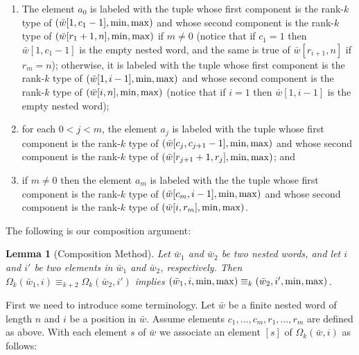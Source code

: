 \documentclass{LMCS}
\newcommand{\w}{{\bar{w}}}
\theoremstyle{plain}
\newtheorem{lemma}[theorem]{Lemma}
\theoremstyle{definition}
\begin{document}
\begin{enumerate}[$\bullet$] 

\item The element $a_0$ is labeled
with the tuple whose first component is
 the rank-$k$ type of
 $(\w[1,c_1-1],\min,\maxx)$ and whose second component is the rank-$k$  
type of 
$(\w[r_1+1,n],\min,\maxx)$ if $m \neq 0$ (notice that if $c_1 = 1$ then 
$\w[1,c_1-1]$ is the empty nested word, and the same is true of
$\w[r_{i+1},n]$ if $r_m = n$); otherwise, it 
is labeled with the tuple whose first component is
 the rank-$k$  type of
 $(\w[1,i-1],\min,\maxx)$ and whose second component is the rank-$k$  
type of 
$(\w[i,n],\min,\maxx)$ (notice that if $i = 1$ then 
$\w[1,i-1]$ is the empty nested word);

\item 
for each $0 < j < m$, the element $a_j$ is labeled with the tuple whose
 first component is 
 the rank-$k$ type of $(\w[c_j,c_{j+1}-1],\min,\maxx)$ and 
whose second component is 
 the rank-$k$ type of $(\w[r_{j+1}+1,r_j],\min,\maxx)$; and 

\item if $m
 \neq 0$ then the element $a_m$
 is labeled with the 
the tuple whose first component is the 
rank-$k$ type of $(\w[c_m,i-1],\min,\maxx)$ and 
whose second component is the rank-$k$ type of 
$(\w[i,r_m],\min,\maxx)$.    
\end{enumerate} 

The following is our composition argument: 

\begin{lemma}[Composition Method] \label{lemma:comp} Let $\w_1$ and
$\w_2$ be two nested words, and let $i$ and $i'$ be two elements in
$\w_1$ and $\w_2$, respectively.  
Then $\Omega_k(\w_1,i) \equiv_{k+2}
\Omega_k(\w_2,i')$ implies $(\w_1,i,\min,\maxx) \equiv_k
(\w_2,i',\min,\maxx)$.  \end{lemma}

\proof
First we need to introduce some terminology.  Let $\w$ be a finite nested
word of length $n$ and $i$ be a position in $\w$. Assume elements
$c_1,\dots,c_m,r_1,\dots,r_m$ are defined as above.  With each element $s$
of $\w$ we associate an element $[s]$ of $\Omega_k(\w,i)$ as
follows:
\end{document}
